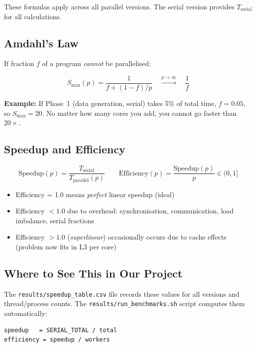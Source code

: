 \documentclass[12pt,a4paper]{article}
\begin{document}
These formulas apply across all parallel versions.  The serial version provides
$T_{\text{serial}}$ for all calculations.

\subsection{Amdahl's Law}

If fraction $f$ of a program \emph{cannot} be parallelised:

\[
S_{\max}(p) = \frac{1}{f + (1-f)/p}
\quad \xrightarrow{p \to \infty} \quad \frac{1}{f}
\]

\textbf{Example:} If Phase~1 (data generation, serial) takes 5\% of total
time, $f = 0.05$, so $S_{\max} = 20$.  No matter how many cores you add,
you cannot go faster than $20\times$.

\subsection{Speedup and Efficiency}

\[
\text{Speedup}(p) = \frac{T_{\text{serial}}}{T_{\text{parallel}}(p)}
\qquad
\text{Efficiency}(p) = \frac{\text{Speedup}(p)}{p} \in (0, 1]
\]

\begin{itemize}
    \item Efficiency = 1.0 means \emph{perfect} linear speedup (ideal)
    \item Efficiency $< 1.0$ due to overhead: synchronisation, communication,
          load imbalance, serial fractions
    \item Efficiency $> 1.0$ (\emph{superlinear}) occasionally occurs due to
          cache effects (problem now fits in L3 per core)
\end{itemize}

\subsection{Where to See This in Our Project}

The \texttt{results/speedup\_table.csv} file records these values for all
versions and thread/process counts.  The \texttt{results/run\_benchmarks.sh}
script computes them automatically:

\begin{verbatim}
speedup   = SERIAL_TOTAL / total
efficiency = speedup / workers
\end{verbatim}

\end{document}
